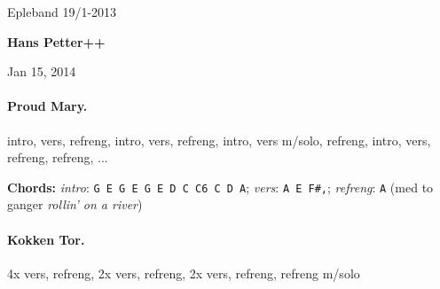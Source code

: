 \documentclass[%
twoside,                 %
final,                   %
10pt]{article}
\begin{document}




\thispagestyle{empty}

\begin{center}
{\LARGE\bf
\begin{spacing}{1.25}
Epleband 19/1-2013
\end{spacing}
}
\end{center}




\begin{center}
{\bf Hans Petter++${}^{}$} \\ [0mm]
\end{center}

\begin{center}
\end{center}


\begin{center}
Jan 15, 2014
\end{center}

\vspace{1cm}





\vspace{1cm} %





\paragraph{Proud Mary.}
intro, vers, refreng, intro, vers, refreng, intro, vers m/solo, refreng,
intro, vers, refreng, refreng, ...

\textbf{Chords:} \emph{intro}: \Verb!G E G E G E D C C6 C D A!;
\emph{vers}: \Verb!A E F#,!; \emph{refreng}: \Verb!A! (med to ganger \emph{rollin' on a river})




\paragraph{Kokken Tor.}
4x vers, refreng, 2x vers, refreng, 2x vers, refreng, refreng m/solo
\end{document}
